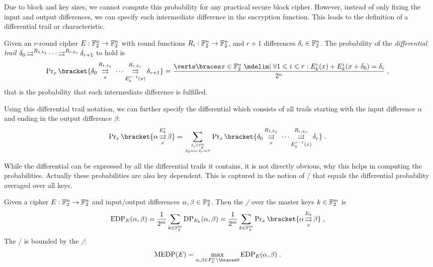 Due to block and key sizes, we cannot compute this probability for any practical secure block cipher.
However, instead of only fixing the input and output differences, we can specify each intermediate difference in the encryption function.
This leads to the definition of a differential trail or characteristic.
\begin{definition}
    Given an $r$-round cipher $E : \mathbb{F}_2^n \to \mathbb{F}_2^n$ with round functions $R_i : \mathbb{F}_2^n \to \mathbb{F}_2^n$, and $r+1$ differences $\delta_i \in \mathbb{F}_2^n$.
    The probability of the \emph{differential trail} $\delta_0 \operatorname*{\rightrightarrows}^{R_{1,k_1}}_{} \cdots \operatorname*{\rightrightarrows}^{R_{r,k_r}}_{} \delta_{r+1}$ to hold is
    \begin{equation*}
        \Prob_x\bracket{\propDiff{\delta_0}{R_{1,k_1}}{x}{\propDiff{\ \cdots}{R_{r,k_r}}{E_k^{r-1}(x)}{\delta_{r+1}}}} = \frac{\abs{\set{x \in \F_2^n \given \forall 1 \leqslant i \leqslant r : E_k^i(x) + E_k^i(x+\delta_0) = \delta_i}}}{2^n}\;,
    \end{equation*}
    that is the probability that each intermediate difference is fulfilled.
\end{definition}

Using this differential trail notation, we can further specify the differential which consists of all trails starting with the input difference $\alpha$ and ending in the output difference $\beta$:
\begin{equation*}
    \Prob_x\bracket{\propDiff{\alpha}{E_k^r}{x}{\beta}}
    = \sum_{\tower{\delta_i \in \F_2^n}{\delta_0 = \alpha, \delta_r = \beta}}
      \Prob_x\bracket{\propDiff{\delta_0}{R_{1,k_1}}{x}{\propDiff{\ \cdots}{R_{r,k_r}}{E_k^{r-1}(x)}{\delta_{r}}}}\;.
\end{equation*}

While the differential can be expressed by all the differential trails it contains, it is not directly obvious, why this helps in computing the probabilities.
Actually these probabilities are also key dependent.
This is captured in the notion of \EDPl/ that equals the differential probability averaged over all keys.
\begin{definition}
    Given a cipher $E : \mathbb{F}_2^n \to \mathbb{F}_2^n$ and input/output differences $\alpha, \beta \in \mathbb{F}_2^n$.
    Then the \emph{\EDP/} over the master keys $k \in \mathbb{F}_2^m$ is
    \begin{equation}
        \label{eqn:edp}
        \mathrm{EDP}_E(\alpha, \beta)
        = \frac{1}{2^m} \sum_{k \in \F_2^m} \mathrm{DP}_{E_k}(\alpha, \beta)
        = \frac{1}{2^m} \sum_{k \in \F_2^m} \Prob_x\bracket{\propDiff{\alpha}{E_k}{x}{\beta}}\;,
    \end{equation}
    The \EDP/ is bounded by the \emph{\MEDP/}:
    \begin{equation*}
        \mathrm{MEDP}(E) = \max_{\alpha, \beta \in F_2^n \setminus \set{0}} \mathrm{EDP}_E(\alpha, \beta)\;.
    \end{equation*}
\end{definition}

